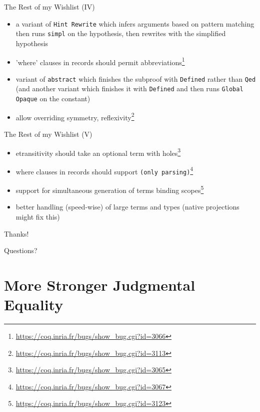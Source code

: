 \documentclass{beamer}
\begin{document}
\begin{frame}{The Rest of my Wishlist (IV)}
\begin{itemize}
  \item 
    a variant of \texttt{Hint Rewrite} which infers arguments based on pattern matching then runs \texttt{simpl} on the hypothesis, then rewrites with the simplified hypothesis
  \item 
    'where' clauses in records should permit abbreviations\footnote{\url{https://coq.inria.fr/bugs/show\_bug.cgi?id=3066}}
  \item 
    variant of \texttt{abstract} which finishes the subproof with \texttt{Defined} rather than \texttt{Qed} (and another variant which finishes it with \texttt{Defined} and then runs \texttt{Global Opaque} on the constant)
  \item 
    allow overriding symmetry, reflexivity\footnote{\url{https://coq.inria.fr/bugs/show\_bug.cgi?id=3113}}
\end{itemize}
\end{frame}

\begin{frame}{The Rest of my Wishlist (V)}
\begin{itemize}
  \item 
    etransitivity should take an optional term with holes\footnote{\url{https://coq.inria.fr/bugs/show\_bug.cgi?id=3065}}
  \item 
    where clauses in records should support \texttt{(only parsing)}\footnote{\url{https://coq.inria.fr/bugs/show\_bug.cgi?id=3067}}
  \item 
    support for simultaneous generation of terms binding scopes\footnote{\url{https://coq.inria.fr/bugs/show\_bug.cgi?id=3123}}
  \item 
    better handling (speed-wise) of large terms and types (native projections might fix this)
\end{itemize}
\end{frame}

\begin{frame}
\Huge\begin{center}
Thanks!

Questions?
\end{center}
\end{frame}

\appendix



\section{More Stronger Judgmental Equality} \label{sec:more-match}
\end{document}
